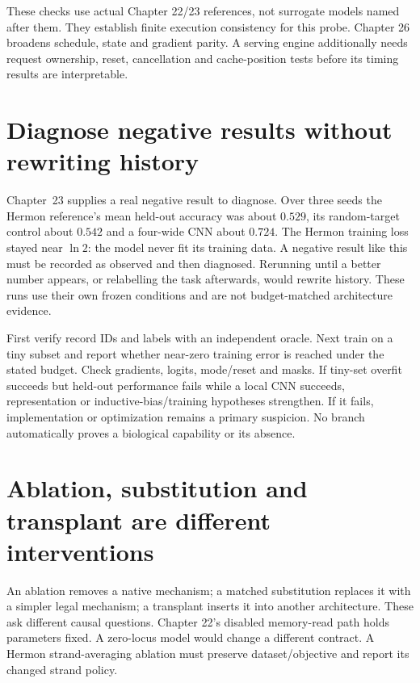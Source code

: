 
These checks use actual Chapter 22/23 references, not surrogate models named
after them. They establish finite execution consistency for this probe.
Chapter 26 broadens schedule, state and gradient parity. A serving engine
additionally needs request ownership, reset, cancellation and cache-position
tests before its timing results are interpretable.

\section{Diagnose negative results without rewriting history}
Chapter~23 supplies a real negative result to diagnose. Over three seeds the Hermon
reference's mean held-out accuracy was about $0.529$, its random-target control about
$0.542$ and a four-wide CNN about $0.724$. The Hermon training loss stayed near $\ln2$:
the model never fit its training data. A negative result like this must be recorded as
observed and then diagnosed. Rerunning until a better number appears, or relabelling the
task afterwards, would rewrite history. These runs use their own frozen conditions and
are not budget-matched architecture evidence.


First verify record IDs and labels with an independent oracle. Next train
on a tiny subset and report whether near-zero training error is reached
under the stated budget. Check gradients, logits, mode/reset and masks.
If tiny-set overfit succeeds but held-out performance fails while a local
CNN succeeds, representation or inductive-bias/training hypotheses strengthen.
If it fails, implementation or optimization remains a primary suspicion.
No branch automatically proves a biological capability or its absence.

\section{Ablation, substitution and transplant are different interventions}
An ablation removes a native mechanism; a matched substitution replaces it
with a simpler legal mechanism; a transplant inserts it into another
architecture. These ask different causal questions.
Chapter 22's disabled memory-read path holds parameters fixed.
A zero-locus model would change a different contract.
A Hermon strand-averaging ablation must preserve dataset/objective and
report its changed strand policy.

